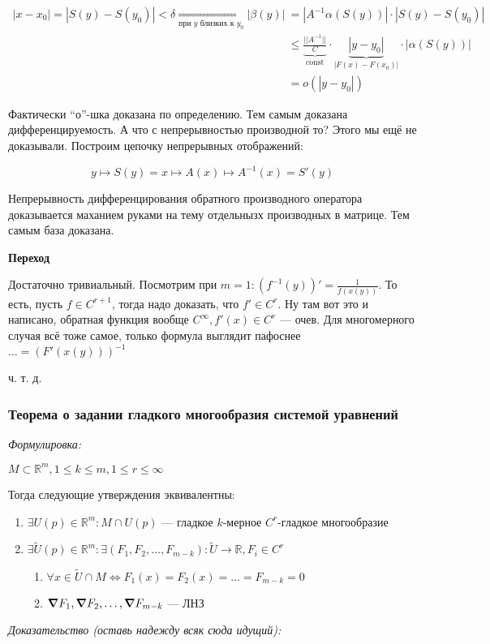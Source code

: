 \documentclass{article}
\DeclareMathOperator{\const}{const}
\begin{document}
\begin{align*}
    |x - x_0| = |S(y) - S(y_0)| < \delta \underset{\text{при }y\text{ близких к }y_0}{\Rightarrow} |\beta(y)| &= |A^{-1}\alpha(S(y))|\cdot|S(y) - S(y_0)| \\
    &\le \underbrace{\frac{||A^{-1}||}{C}}_{\const}\cdot\underbrace{|y - y_0|}_{|F(x) - F(x_0)|}\cdot|\alpha(S(y))| \\
    &= o(|y - y_0|)
\end{align*}

Фактически ``о''-шка доказана по определению. Тем самым доказана дифференцируемость. А что с непрерывностью производной то? Этого мы ещё не доказывали. Построим цепочку непрерывных отображений:

\[y \mapsto S(y) = x \mapsto A(x) \mapsto A^{-1}(x) = S'(y)\]

Непрерывность дифференцирования обратного производного оператора доказывается маханием руками на тему отдельнызх производных в матрице. Тем самым база доказана.

\textbf{Переход}

Достаточно тривиальный. Посмотрим при $m = 1: (f^{-1}(y))' = \frac{1}{f(x(y))}$. То есть, пусть $f \in C^{r + 1}$, тогда надо доказать, что $f' \in C^r$. Ну там вот это и написано, обратная функция вообще $C^\infty, f'(x) \in C^r$ --- очев. Для многомерного случая всё тоже самое, только формула выглядит пафоснее $\ldots = (F'(x(y)))^{-1}$

ч. т. д.

\subsubsection{Теорема о задании гладкого многообразия системой уравнений}
\textit{Формулировка:}

$M \subset \mathbb{R}^m, 1 \le k \le m, 1 \le r \le \infty$

Тогда следующие утверждения эквивалентны:

\begin{enumerate}
    \item $\exists U(p) \in \mathbb{R}^m: M \cap U(p)$ --- гладкое $k$-мерное $C^r$-гладкое многообразие
    \item $\exists \widetilde{U}(p) \in \mathbb{R}^m: \exists (F_1, F_2, \ldots, F_{m - k}): \widetilde{U} \rightarrow \mathbb{R}, F_i \in C^r$ \begin{enumerate}
        \item $\forall x \in \widetilde{U} \cap M \Leftrightarrow F_1(x) = F_2(x) = \ldots = F_{m - k} = 0$
        \item $\grad F_1, \grad F_2, \ldots, \grad F_{m - k}$ --- ЛНЗ
    \end{enumerate}
\end{enumerate}
\textit{Доказательство (оставь надежду всяк сюда идущий):}
\end{document}

